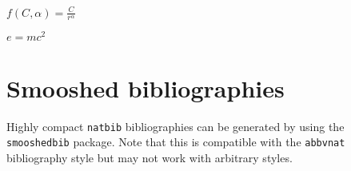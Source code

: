 \documentclass[draft,12pt]{article}
\begin{document}
\begin{unlabeledexample}
\label{ex:zipf}
$\displaystyle f(C, \alpha) = \frac{C}{r^\alpha}$
\end{unlabeledexample}

\begin{unlabeledexample}
$e = mc^2$
\end{unlabeledexample}

\section{Smooshed bibliographies}

Highly compact \texttt{natbib} bibliographies can be generated by using the \texttt{smooshedbib} package. Note that this is compatible with the \texttt{abbvnat} bibliography style but may not work with arbitrary styles.



\end{document}
